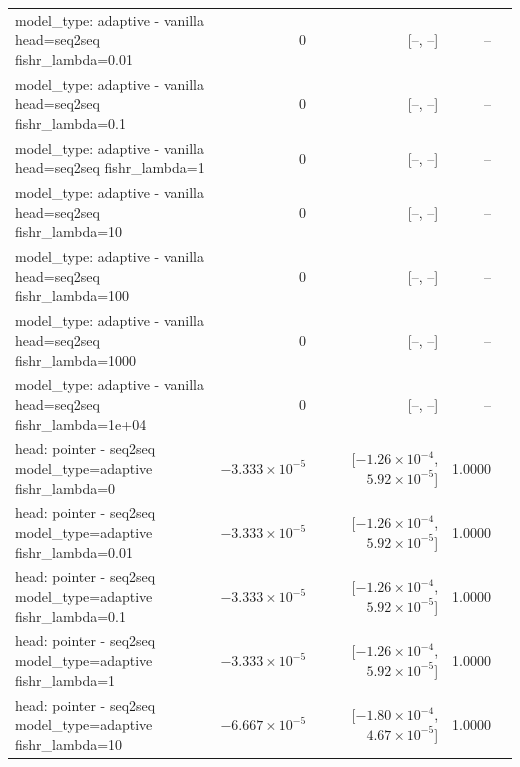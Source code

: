 \documentclass[10pt]{article}
\makeatletter
\newcommand{\stackcell}[1]{\begin{tabular}[t]{@{}l@{}}#1\end{tabular}}
\makeatother
\begin{document}
{\begin{longtable}{lrrrl}
\stackcell{model\_type: adaptive - vanilla\\\footnotesize head=seq2seq fishr\_lambda=0.01 } & 0 & [--, --] & -- & \\
\stackcell{model\_type: adaptive - vanilla\\\footnotesize head=seq2seq fishr\_lambda=0.1 } & 0 & [--, --] & -- & \\
\stackcell{model\_type: adaptive - vanilla\\\footnotesize head=seq2seq fishr\_lambda=1 } & 0 & [--, --] & -- & \\
\stackcell{model\_type: adaptive - vanilla\\\footnotesize head=seq2seq fishr\_lambda=10 } & 0 & [--, --] & -- & \\
\stackcell{model\_type: adaptive - vanilla\\\footnotesize head=seq2seq fishr\_lambda=100 } & 0 & [--, --] & -- & \\
\stackcell{model\_type: adaptive - vanilla\\\footnotesize head=seq2seq fishr\_lambda=1000 } & 0 & [--, --] & -- & \\
\stackcell{model\_type: adaptive - vanilla\\\footnotesize head=seq2seq fishr\_lambda=1e+04 } & 0 & [--, --] & -- & \\
\stackcell{head: pointer - seq2seq\\\footnotesize model\_type=adaptive fishr\_lambda=0 } & $-3.333\times10^{-5}$ & [$-1.26\times10^{-4}$, $5.92\times10^{-5}$] & 1.0000 & \\
\stackcell{head: pointer - seq2seq\\\footnotesize model\_type=adaptive fishr\_lambda=0.01 } & $-3.333\times10^{-5}$ & [$-1.26\times10^{-4}$, $5.92\times10^{-5}$] & 1.0000 & \\
\stackcell{head: pointer - seq2seq\\\footnotesize model\_type=adaptive fishr\_lambda=0.1 } & $-3.333\times10^{-5}$ & [$-1.26\times10^{-4}$, $5.92\times10^{-5}$] & 1.0000 & \\
\stackcell{head: pointer - seq2seq\\\footnotesize model\_type=adaptive fishr\_lambda=1 } & $-3.333\times10^{-5}$ & [$-1.26\times10^{-4}$, $5.92\times10^{-5}$] & 1.0000 & \\
\stackcell{head: pointer - seq2seq\\\footnotesize model\_type=adaptive fishr\_lambda=10 } & $-6.667\times10^{-5}$ & [$-1.80\times10^{-4}$, $4.67\times10^{-5}$] & 1.0000 & \\

\end{longtable}}
\end{document}

